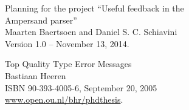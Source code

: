 \label{sec:bibliography}

\begin{thebibliography}{99}

	Planning for the project ``Useful feedback in the\\ Ampersand parser''\\
	Maarten Baertsoen and Daniel S. C. Schiavini\\
	Version 1.0 -- November 13, 2014.

	Top Quality Type Error Messages\\
	Bastiaan Heeren\\
	ISBN 90-393-4005-6, September 20, 2005\\
	\url{www.open.ou.nl/bhr/phdthesis}.

\end{thebibliography}